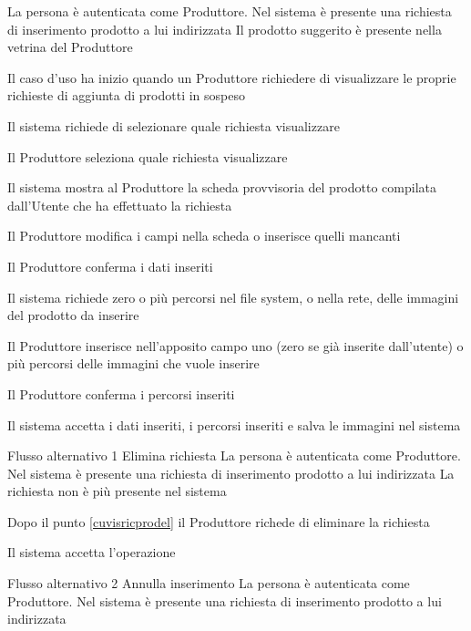 {}
{La persona è autenticata come Produttore. Nel sistema è presente una richiesta di inserimento prodotto a lui indirizzata}
{Il prodotto suggerito è presente nella vetrina del Produttore}
{\begin{enumCU}
		\item Il caso d'uso ha inizio quando un Produttore richiedere di visualizzare le proprie richieste di aggiunta di prodotti in sospeso
		\item Il sistema richiede di selezionare quale richiesta visualizzare
		\item Il Produttore seleziona quale richiesta visualizzare
		\item Il sistema mostra al Produttore la scheda provvisoria del prodotto compilata dall'Utente che ha effettuato la richiesta \label{cuvisricprodel}
		\item Il Produttore modifica i campi nella scheda o inserisce quelli mancanti \label{cuvisricpro:1}
		\item Il Produttore conferma i dati inseriti
		\item Il sistema richiede zero o più percorsi nel file system, o nella rete, delle immagini del prodotto da inserire
		\item Il Produttore inserisce nell'apposito campo uno (zero se già inserite dall'utente) o più percorsi delle immagini che vuole inserire \label{cuvisricpro:2}
		\item Il Produttore conferma i percorsi inseriti \label{cuvisricpro:3}
		\item Il sistema accetta i dati inseriti, i percorsi inseriti e salva le immagini nel sistema
	\end{enumCU}}
%
{Flusso alternativo 1}%
{Elimina richiesta}%
{La persona è autenticata come Produttore. Nel sistema è presente una richiesta di inserimento prodotto a lui indirizzata}
{La richiesta non è più presente nel sistema}%
{\begin{enumCU}
		\item Dopo il punto \ref{cuvisricprodel} il Produttore richede di eliminare la richiesta
		\item Il sistema accetta l'operazione
	\end{enumCU}}%
%
{Flusso alternativo 2}%
{Annulla inserimento}%
{La persona è autenticata come Produttore. Nel sistema è presente una richiesta di inserimento prodotto a lui indirizzata}
